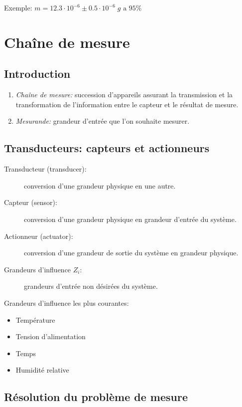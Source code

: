 \documentclass[10pt]{article} %
\begin{document}
\begin{multicols}{3}
\begin{flushleft}
			Exemple: $m=12.3\cdot 10^{-6} \pm 0.5\cdot 10^{-6} \; g \text{ a } 95\%$
			
	\section*{Chaîne de mesure}
	
		\subsection*{Introduction}
			
			\begin{enumerate}
				\item \emph{Chaîne de mesure:} succession d'appareils assurant la transmission et la transformation de l'information entre le capteur et le résultat de mesure.
				\item \emph{Mesurande:} grandeur d'entrée que l'on souhaite mesurer.
			\end{enumerate}
		
		\subsection*{Transducteurs: capteurs et actionneurs}
			
			\begin{description}
				\item [Transducteur (transducer):] conversion d'une grandeur physique en une autre.
				\item [Capteur (sensor):] conversion d'une grandeur physique en grandeur d'entrée du système.
				\item [Actionneur (actuator):] conversion d'une grandeur de sortie du système en grandeur physique.
				\item [Grandeurs d'influence $Z_i$:] grandeurs d'entrée non désirées du système.
			\end{description}
			
			Grandeurs d'influence les plus courantes: 
			
			\begin{itemize}
				\item Température
				\item Tension d'alimentation
				\item Temps
				\item Humidité relative
			\end{itemize}
		
		\subsection*{Résolution du problème de mesure}
		

\end{flushleft}
\end{multicols}
\end{document}
